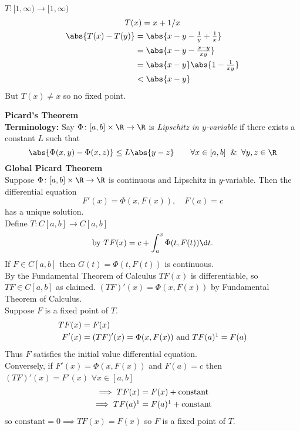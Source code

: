 \ex $T\colon[1,\infty)\to[1,\infty)$
\begin{gather*}
T(x) = x + 1/x \\
\begin{aligned}
\abs{T(x)-T(y)} &= \abs{x-y-\tfrac1y+\tfrac1x} \\
&= \abs{x-y-\tfrac{x-y}{xy}} \\
&= \abs{x-y}\abs{1-\tfrac{1}{xy}} \\
&< \abs{x-y}
\end{aligned}
\end{gather*}
But $T(x)\neq x$ so no fixed point.

\textbf{Picard's Theorem} \\
\textbf{Terminology: }Say $\Phi\colon[a,b]\times\R\to\R$ is \emph{Lipschitz in\/ $y$-variable} if there exists a constant $L$ such that
\[ \abs{\Phi(x,y)-\Phi(x,z)} \leq L\abs{y-z} \qquad\forall x\in[a,b] \And \forall y,z\in\R \]
%
\textbf{Global Picard Theorem} \\
Suppose $\Phi\colon[a,b]\times\R\to\R$ is continuous and Lipschitz in $y$-variable.  Then the differential equation %
\[ F'(x) = \Phi(x,F(x)), \quad F(a)=c \]
has a unique solution. \\
\pf Define $T\colon C[a,b]\to C[a,b]$
\[ \text{by } TF(x) = c + \int_a^x \Phi(t,F(t))\d t . \]
If $F\in C[a,b]$ then $G(t)=\Phi(t,F(t))$ is continuous. \\
By the Fundamental Theorem of Calculus $TF(x)$ is differentiable, so $TF\in C[a,b]$ as claimed.
$(TF)'(x)=\Phi(x,F(x))$ by Fundamental Theorem of Calculus. \\
Suppose $F$ is a fixed point of $T$.
\begin{align*}
TF(x) &= F(x) \\
F'(x) &= (TF)'(x) = \Phi(x,F(x)) \text{ and } TF(a)\footnotemark = F(a)
\end{align*}%
Thus $F$ satisfies the initial value differential equation. \\%
Conversely, if $F'(x)=\Phi(x,F(x))$ and $F(a)=c$ then $(TF)'(x)=F'(x)$ $\forall x\in[a,b]$ %
\begin{align*}
\implies TF(x) &= F(x) + \text{constant} \\
\implies TF(a)\addtocounter{footnote}{-1}\footnotemark &= F(a)\addtocounter{footnote}{-1}\footnotemark + \text{constant}
\end{align*}%
so $\text{constant}=0\implies TF(x)=F(x)$ so $F$ is a fixed point of $T$. \\
